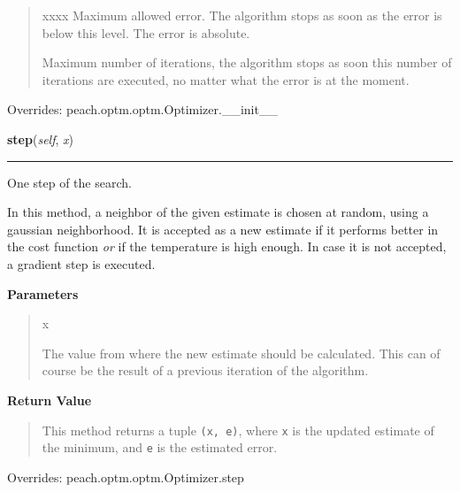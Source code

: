\begin{boxedminipage}{\textwidth}
\begin{quote}
\begin{Ventry}{xxxx}
Maximum allowed error. The algorithm stops as soon as the error is
below this level. The error is absolute.
          \item[imax]


Maximum number of iterations, the algorithm stops as soon this
number of iterations are executed, no matter what the error is at
the moment.
        \end{Ventry}

      \end{quote}

    \vspace{1ex}

      Overrides: peach.optm.optm.Optimizer.\_\_init\_\_

    \end{boxedminipage}

    \vspace{0.5ex}

    \begin{boxedminipage}{\textwidth}

    \raggedright \textbf{step}(\textit{self}, \textit{x})

    \vspace{-1.5ex}

    \rule{\textwidth}{0.5\fboxrule}

One step of the search.

In this method, a neighbor of the given estimate is chosen at random,
using a gaussian neighborhood. It is accepted as a new estimate if it
performs better in the cost function \emph{or} if the temperature is high
enough. In case it is not accepted, a gradient step is executed.
    \vspace{1ex}

      \textbf{Parameters}
      \begin{quote}
        \begin{Ventry}{x}

          \item[x]


The value from where the new estimate should be calculated. This can
of course be the result of a previous iteration of the algorithm.
        \end{Ventry}

      \end{quote}

    \vspace{1ex}

      \textbf{Return Value}
      \begin{quote}

This method returns a tuple \texttt{(x, e)}, where \texttt{x} is the updated
estimate of the minimum, and \texttt{e} is the estimated error.
      \end{quote}

    \vspace{1ex}

      Overrides: peach.optm.optm.Optimizer.step

    \end{boxedminipage}

